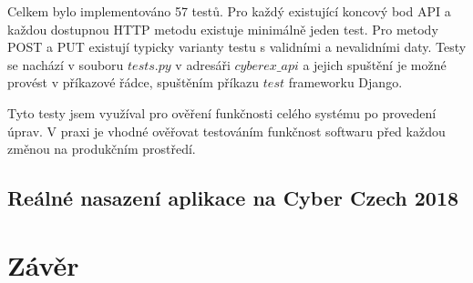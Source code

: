 \documentclass[
  digital, %
  twoside, %
  table,   %
  lof,     %
  lot,     %
]{fithesis3}
\begin{document}
Celkem bylo implementováno 57 testů. Pro každý existující koncový bod API a každou dostupnou HTTP metodu existuje minimálně jeden test. Pro metody POST a PUT existují typicky varianty testu s validními a nevalidními daty. Testy se nachází v souboru $tests.py$ v adresáři $cyberex\_api$ a jejich spuštění je možné provést v příkazové řádce, spuštěním příkazu $test$ frameworku Django.

Tyto testy jsem využíval pro ověření funkčnosti celého systému po provedení úprav. V praxi je vhodné ověřovat testováním funkčnost softwaru před každou změnou na produkčním prostředí.

\section{Reálné nasazení aplikace na Cyber Czech 2018}



\chapter{Závěr}

\printbibliography[heading=bibintoc] %
\end{document}
